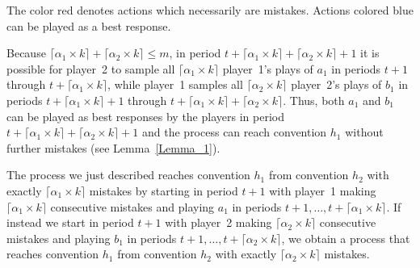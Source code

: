 \documentclass[11.5pt]{article}
\begin{document}
\begin{table}[htbp]
\centering
{}
\small
The color red denotes actions which necessarily are mistakes. Actions colored blue can be played as a best response.
\end{table}


Because $\lceil \alpha_1 \times k \rceil + \lceil \alpha_2 \times k \rceil \leq m$, in period $t + \lceil \alpha_1 \times k \rceil + \lceil \alpha_2 \times k \rceil + 1$ it is possible for player~2 to sample all $\lceil \alpha_1 \times k \rceil$ player~1's plays of $a_1$ in periods $t + 1$ through $t + \lceil \alpha_1 \times k \rceil$, while player~1 samples all $\lceil \alpha_2 \times k \rceil $ player~2's plays of $b_1$ in periods $t+\lceil \alpha_1 \times k \rceil + 1$ through $t + \lceil \alpha_1 \times k \rceil + \lceil \alpha_2 \times k \rceil$. Thus, both $a_1$ and $b_1$ can be played as best responses by the players in period $t + \lceil \alpha_1 \times k \rceil + \lceil \alpha_2 \times k \rceil + 1$ and the process can reach convention $h_1$ without further mistakes (see Lemma~\ref{Lemma_1}). 

The  process we just described reaches convention $h_1$ from convention $h_2$ with exactly $\lceil \alpha_1 \times k \rceil$ mistakes by starting in period $t+1$ with player~1 making $\lceil \alpha_1 \times k \rceil$ consecutive mistakes and playing $a_1$ in periods $t+1, \dots, t+ \lceil \alpha_1 \times k \rceil$. If instead we start in period $t+1$ with player~2 making $\lceil \alpha_2 \times k \rceil$ consecutive mistakes and playing $b_1$ in periods $t+1, \dots, t+ \lceil \alpha_2 \times k \rceil$, we obtain a process that reaches convention $h_1$ from convention $h_2$ with exactly $\lceil \alpha_2 \times k \rceil$ mistakes. 
\end{document}
